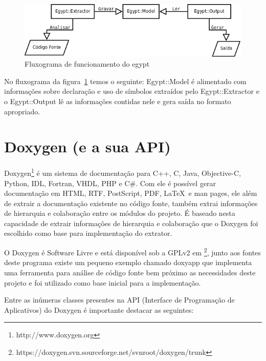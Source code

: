 \begin{figure}[h]
\center
\includegraphics[scale=0.4]{imagens/egypt-fluxogram}
\caption{Fluxograma de funcionamento do egypt}
\label{egypt-fluxogram}
\end{figure}

No fluxograma da figura~\ref{egypt-fluxogram} temos o seguinte: Egypt::Model é
alimentado com informações sobre declaração e uso de símbolos extraídos pelo
Egypt::Extractor e o Egypt::Output lê as informações contidas nele e gera saída
no formato apropriado.

\section{Doxygen (e a sua API)}

Doxygen\footnote{http://www.doxygen.org} é um sistema de documentação para C++,
C, Java, Objective-C, Python, IDL,
Fortran, VHDL, PHP e C\#. Com ele é possível gerar documentação em
HTML, RTF,
PostScript, PDF, \LaTeX\ e man pages, ele
além de extrair a documentação existente no código fonte, também extrai
informações de hierarquia e colaboração entre os módulos do projeto. É baseado
nesta capacidade de extrair informações de hierarquia e colaboração que o
Doxygen foi escolhido como base para implementação do extrator.

O Doxygen é Software Livre e está disponível sob a GPLv2 em
\footnote{https://doxygen.svn.sourceforge.net/svnroot/doxygen/trunk}, junto aos
fontes deste programa existe um pequeno exemplo chamado doxyapp que implementa
uma ferramenta para análise de código fonte bem próximo as necessidades deste
projeto e foi utilizado como base inicial para a implementação.

Entre as inúmeras classes presentes na API (Interface de Programação de Aplicativos) do Doxygen é importante
destacar as seguintes:

